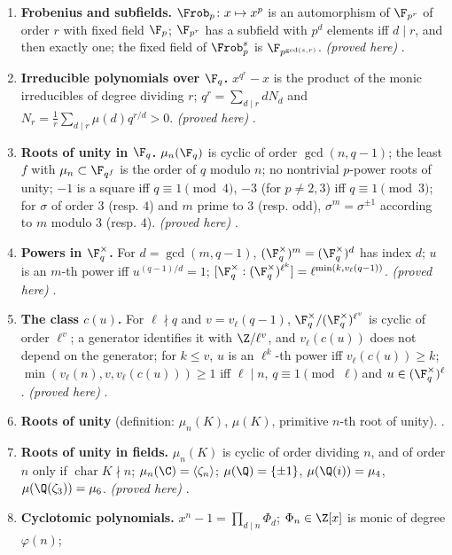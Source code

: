 \begin{enumerate}[label=\textbf{\thechapter.\arabic*}]
\item \textbf{Frobenius and subfields.} $\Frob_p\colon x\mapsto x^p$ is an automorphism of $\F_{p^r}$ of order $r$ with fixed field $\F_p$;
$\F_{p^r}$ has a subfield with $p^d$ elements iff $d\mid r$, and then exactly one; the fixed field of $\Frob_p^s$ is $\F_{p^{\gcd(s,r)}}$.
\emph{(proved here)} .
\item \textbf{Irreducible polynomials over $\F_q$.} $x^{q^r}-x$ is the product of the monic irreducibles of degree dividing $r$;
$q^r=\sum_{d\mid r}dN_d$ and $N_r=\frac1r\sum_{d\mid r}\mu(d)q^{r/d}>0$. \emph{(proved here)} .
\item \textbf{Roots of unity in $\F_q$.} $\mu_n(\F_q)$ is cyclic of order $\gcd(n,q-1)$; the least $f$ with $\mu_n\subset\F_{q^f}$ is the order of $q$
modulo $n$; no nontrivial $p$-power roots of unity; $-1$ is a square iff $q\equiv1\pmod4$, $-3$ (for $p\ne2,3$) iff $q\equiv1\pmod3$; for
$\sigma$ of order $3$ (resp. $4$) and $m$ prime to $3$ (resp. odd), $\sigma^m=\sigma^{\pm1}$ according to $m$ modulo $3$ (resp. $4$).
\emph{(proved here)} .
\item \textbf{Powers in $\F_q^\times$.} For $d=\gcd(m,q-1)$, $(\F_q^\times)^m=(\F_q^\times)^d$ has index $d$; $u$ is an $m$-th power iff
$u^{(q-1)/d}=1$; $[\F_q^\times:(\F_q^\times)^{\ell^k}]=\ell^{\min(k,v_\ell(q-1))}$. \emph{(proved here)} .
\item \textbf{The class $c(u)$.} For $\ell\nmid q$ and $v=v_\ell(q-1)$, $\F_q^\times/(\F_q^\times)^{\ell^v}$ is cyclic of order $\ell^v$; a generator identifies it
with $\Z/\ell^v$, and $v_\ell(c(u))$ does not depend on the generator; for $k\le v$, $u$ is an $\ell^k$-th power iff $v_\ell(c(u))\ge k$;
$\min(v_\ell(n),v,v_\ell(c(u)))\ge1$ iff $\ell\mid n$, $q\equiv1\pmod\ell$ and $u\in(\F_q^\times)^\ell$. \emph{(proved here)} .
\item \textbf{Roots of unity} (definition: $\mu_n(K)$, $\mu(K)$, primitive $n$-th root of unity). .
\item \textbf{Roots of unity in fields.} $\mu_n(K)$ is cyclic of order dividing $n$, and of order $n$ only if $\operatorname{char}K\nmid n$;
$\mu_n(\C)=\langle\zeta_n\rangle$; $\mu(\Q)=\{\pm1\}$, $\mu(\Q(i))=\mu_4$, $\mu(\Q(\zeta_3))=\mu_6$. \emph{(proved here)} .
\item \textbf{Cyclotomic polynomials.} $x^n-1=\prod_{d\mid n}\Phi_d$; $\Phi_n\in\Z[x]$ is monic of degree $\varphi(n)$;

\end{enumerate}
